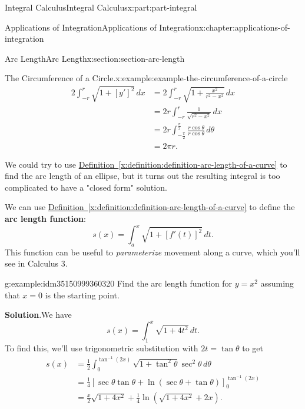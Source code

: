 \documentclass[twoside,10pt,]{book}
\newcommand{\blocktitlefont}{\relax}
\newcommand{\xreffont}{\relax}
\newcommand{\terminology}[1]{\textbf{#1}}
\numberwithin{equation}{part}
\newcommand{\amp}{&}
\begin{document}
\begin{partptx}{Integral Calculus}{}{Integral Calculus}{}{}{x:part:part-integral}
\begin{chapterptx}{Applications of Integration}{}{Applications of Integration}{}{}{x:chapter:applications-of-integration}
\begin{sectionptx}{Arc Length}{}{Arc Length}{}{}{x:section:section-arc-length}
\begin{example}{The Circumference of a Circle.}{x:example:example-the-circumference-of-a-circle}
\begin{align*}
2\int_{-r}^{r}\sqrt{1 + [y']^{2}}\,dx \amp = 2\int_{-r}^{r}\sqrt{1 + \frac{x^{2}}{r^{2} - x^{2}}}\,dx \\
\amp = 2r\int_{-r}^{r}\frac{1}{\sqrt{r^{2} - x^{2}}}\,dx \\
\amp = 2r\int_{-\frac{\pi}{2}}^{\frac{\pi}{2}}\frac{r\cos\theta}{r\cos\theta}\,d\theta \\
\amp = 2\pi r. 
\end{align*}
%
\end{example}
We could try to use \hyperref[x:definition:definition-arc-length-of-a-curve]{Definition~{\xreffont\ref{x:definition:definition-arc-length-of-a-curve}}} to find the arc length of an ellipse, but it turns out the resulting integral is too complicated to have a "closed form" solution.%
\par
We can use \hyperref[x:definition:definition-arc-length-of-a-curve]{Definition~{\xreffont\ref{x:definition:definition-arc-length-of-a-curve}}} to define the \terminology{arc length function}:%
\begin{equation*}
s(x) = \int_{a}^{x}\sqrt{1 + [f'(t)]^{2}}\,dt.
\end{equation*}
This function can be useful to \emph{parameterize} movement along a curve, which you'll see in Calculus 3.%
\begin{example}{}{g:example:idm35150999360320}%
Find the arc length function for \(y = x^{2}\) assuming that \(x = 0\) is the starting point.%
\par\smallskip%
\noindent\textbf{\blocktitlefont Solution}.\hypertarget{g:solution:idm35150999359040}{}\quad{}We have%
\begin{equation*}
s(x) = \int_{1}^{x}\sqrt{1 + 4t^{2}}\,dt.
\end{equation*}
To find this, we'll use trigonometric substitution with \(2t = \tan\theta\) to get%
\begin{align*}
s(x) \amp = \frac{1}{2}\int_{0}^{\tan^{-1}(2x)}\sqrt{1 + \tan^{2}\theta}\sec^{2}\theta\,d\theta \\
\amp = \frac{1}{4}\left[\sec\theta\tan\theta + \ln(\sec\theta + \tan\theta)\right]_{0}^{\tan^{-1}(2x)} \\
\amp = \frac{x}{2}\sqrt{1 + 4x^{2}} + \frac{1}{4}\ln(\sqrt{1 + 4x^{2}} + 2x). 
\end{align*}
%
\end{example}
\end{sectionptx}
%
%
\typeout{************************************************}

\end{chapterptx}
\end{partptx}
\end{document}
